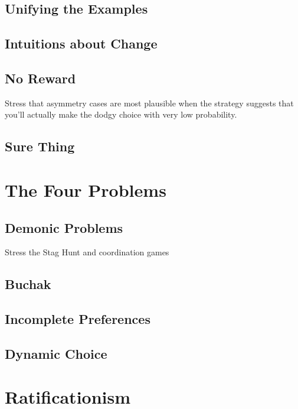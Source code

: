 \documentclass[
  10pt,
  letterpaper,
  DIV=11,
  numbers=noendperiod,
  twoside]{scrartcl}
\begin{document}
\subsection{Unifying the Examples}\label{unifying-the-examples}

\subsection{Intuitions about Change}\label{intuitions-about-change}

\subsection{No Reward}\label{no-reward}

Stress that asymmetry cases are most plausible when the strategy
suggests that you'll actually make the dodgy choice with very low
probability.

\subsection{Sure Thing}\label{sure-thing}

\section{The Four Problems}\label{the-four-problems}

\subsection{Demonic Problems}\label{demonic-problems}

Stress the Stag Hunt and coordination games

\subsection{Buchak}\label{sec-buchak}

\subsection{Incomplete Preferences}\label{incomplete-preferences}

\subsection{Dynamic Choice}\label{dynamic-choice}

\section{Ratificationism}\label{ratificationism}
\end{document}
